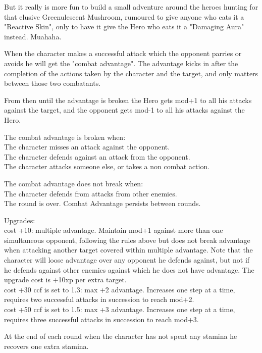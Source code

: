 But it really is more fun to build a small adventure around the heroes hunting for that elusive Greenulescent Mushroom, rumoured to give anyone who eats it a "Reactive Skin", only to have it give the Hero who eats it a "Damaging Aura" instead. Muahaha.


\openskillslist

 When the character makes a successful attack which the opponent parries or avoids he will get the "combat advantage". The advantage kicks in after the completion of the actions taken by the character and the target, and only matters between those two combatants.

From then until the advantage is broken the Hero gets mod+1 to all his attacks against the target, and the opponent gets mod-1 to all his attacks against the Hero.

The combat advantage is broken when: \\
The character misses an attack against the opponent. \\
The character defends against an attack from the opponent. \\
The character attacks someone else, or takes a non combat action.

The combat advantage does not break when: \\
The character defends from attacks from other enemies. \\
The round is over. Combat Advantage persists between rounds.

Upgrades: \\
cost +10: multiple advantage. Maintain mod+1 against more than one simultaneous opponent, following the rules above but does not break advantage when attacking another target covered within multiple advantage. Note that the character will loose advantage over any opponent he defends against, but not if he defends against other enemies against which he does not have advantage. The upgrade cost is +10xp per extra target. \\
cost +30 ccf is set to 1.3: max +2 advantage. Increases one step at a time, requires two successful attacks in succession to reach mod+2. \\
cost +50 ccf is set to 1.5: max +3 advantage. Increases one step at a time, requires three successful attacks in succession to reach mod+3.


 At the end of each round when the character has not spent any stamina he recovers one extra stamina.


